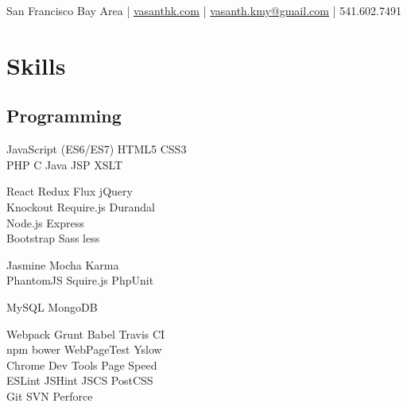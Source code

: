\documentclass[]{my-resume-openfont}
\begin{document}
%
%

{ San Francisco Bay Area 
| \href{http://www.vasanthk.com}{vasanthk.com} 
| \href{mailto:vasanth.kmy@gmail.com}{vasanth.kmy@gmail.com} 
| 541.602.7491 \\
}

%
%

\begin{minipage}[t]{0.33\textwidth} 


\section{Skills}
\subsection{Programming}
JavaScript (ES6/ES7) \textbullet{} HTML5 \textbullet{} CSS3 \\
PHP \textbullet{} C \textbullet{} Java \textbullet{} JSP \textbullet{} XSLT \\
\sectionsep

React \textbullet{} Redux \textbullet{} Flux \textbullet{} jQuery \\ 
Knockout \textbullet{} Require.js \textbullet{} Durandal \\
Node.js \textbullet{} Express \\
Bootstrap \textbullet{} Sass \textbullet{} less \\
\sectionsep

Jasmine \textbullet{} Mocha \textbullet{} Karma \\
PhantomJS \textbullet{} Squire.js \textbullet{} PhpUnit
\sectionsep

MySQL \textbullet{} MongoDB \\
\sectionsep

Webpack \textbullet{} Grunt \textbullet{} Babel \textbullet{} Travis CI \\
npm \textbullet{} bower \textbullet{} WebPageTest \textbullet{} Yslow \\
Chrome Dev Tools \textbullet{} Page Speed \\
ESLint \textbullet{} JSHint \textbullet{} JSCS \textbullet{} PostCSS \\
Git \textbullet{} SVN \textbullet{} Perforce
\sectionsep


\end{minipage}
\end{document}
